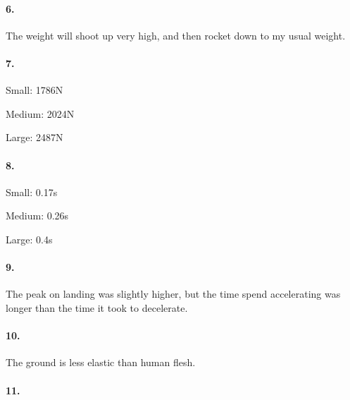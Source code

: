         \paragraph*{6.}

        \begin{mdframed}
            The weight will shoot up very high, and then rocket down to my usual weight.
        \end{mdframed}

        \paragraph*{7.}

        \begin{mdframed}
            Small: 1786N

            Medium: 2024N

            Large: 2487N
        \end{mdframed}

        \paragraph*{8.}

        \begin{mdframed}
            Small: 0.17s

            Medium: 0.26s

            Large: 0.4s
        \end{mdframed}

        \paragraph*{9.}

        \begin{mdframed}
            The peak on landing was slightly higher, but the time spend accelerating was longer than the time it took to decelerate.
        \end{mdframed}

        \paragraph*{10.}

        \begin{mdframed}
            The ground is less elastic than human flesh.
        \end{mdframed}

        \paragraph*{11.}


